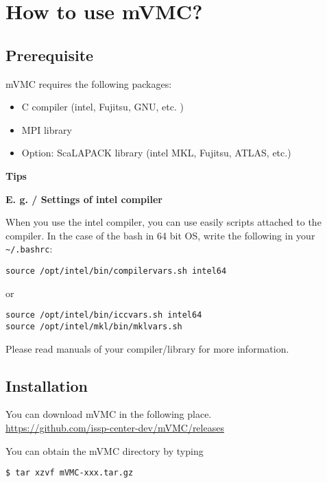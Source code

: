 \chapter{How to use mVMC?}
\label{Ch:HowTo}

\section{Prerequisite}

mVMC requires the following packages:
\begin{itemize}
\item C compiler (intel, Fujitsu, GNU, etc. )
\item MPI library
\item Option: ScaLAPACK library (intel MKL, Fujitsu, ATLAS, etc.)
\end{itemize}

\begin{screen}
\Large 
{\bf Tips}
\normalsize

{\bf E. g. / Settings of intel compiler}

When you use the intel compiler, you can use easily scripts attached to the compiler.
In the case of the bash in 64 bit OS, write the following in your \verb|~/.bashrc|:
\begin{verbatim}
source /opt/intel/bin/compilervars.sh intel64
\end{verbatim}
or
\begin{verbatim}
source /opt/intel/bin/iccvars.sh intel64
source /opt/intel/mkl/bin/mklvars.sh
\end{verbatim}

Please read manuals of your compiler/library for more information.

\end{screen}

\section{Installation}

You can download mVMC in the following place.\\
\url{https://github.com/issp-center-dev/mVMC/releases}

You can obtain the mVMC directory by typing
\begin{verbatim}
$ tar xzvf mVMC-xxx.tar.gz
\end{verbatim}


